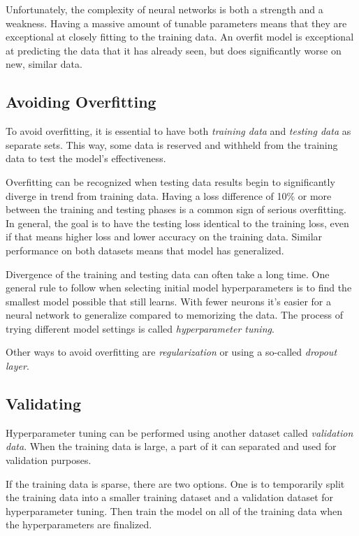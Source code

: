 \documentclass[a4paper]{article}
\begin{document}
Unfortunately, the complexity of neural networks is both a strength and a weakness. Having a massive amount of tunable parameters means that they are exceptional at closely fitting to the training data. An overfit model is exceptional at predicting the data that it has already seen, but does significantly worse on new, similar data.

\subsection*{Avoiding Overfitting}
To avoid overfitting, it is essential to have both \emph{training data} and \emph{testing data} as separate sets. This way, some data is reserved and withheld from the training data to test the model's effectiveness. 

Overfitting can be recognized when testing data results begin to significantly diverge in trend from training data. Having a loss difference of 10\% or more between the training and testing phases is a common sign of serious overfitting. In general, the goal is to have the testing loss identical to the training loss, even if that means higher loss and lower accuracy on the training data. Similar performance on both datasets means that model has generalized.

Divergence of the training and testing data can often take a long time. One general rule to follow when selecting initial model hyperparameters is to find the smallest model possible that still learns. With fewer neurons it's easier for a neural network to generalize compared to memorizing the data. The process of trying different model settings is called \emph{hyperparameter tuning}.

Other ways to avoid overfitting are \emph{regularization} or using a so-called \emph{dropout layer}. 

\subsection*{Validating}
Hyperparameter tuning can be performed using another dataset called \emph{validation data}. When the training data is large, a part of it can separated and used for validation purposes.

If the training data is sparse, there are two options. One is to temporarily split the training data into a smaller training dataset and a validation dataset for hyperparameter tuning. Then train the model on all of the training data when the hyperparameters are finalized.
\end{document}
